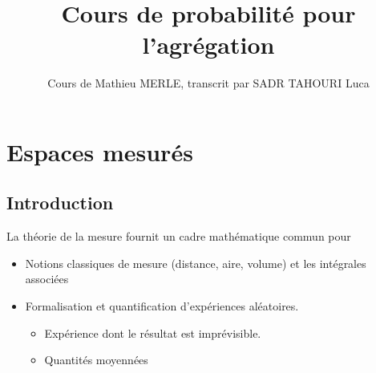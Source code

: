\documentclass[]{report}
\title{Cours de probabilité pour l'agrégation}
\author{Cours de Mathieu MERLE, transcrit par SADR TAHOURI Luca}
\date{}
\begin{document}
\maketitle
\tableofcontents

\chapter{Espaces mesurés}

\section{Introduction}

La théorie de la mesure fournit un cadre mathématique commun pour
\begin{itemize}
    \item Notions classiques de mesure (distance, aire, volume) et les intégrales associées
    \item Formalisation et quantification d'expériences aléatoires.
          \begin{itemize}[label=$\hookrightarrow$]
              \item Expérience dont le résultat est imprévisible.
              \item Quantités moyennées
          \end{itemize}
\end{itemize}
\end{document}
